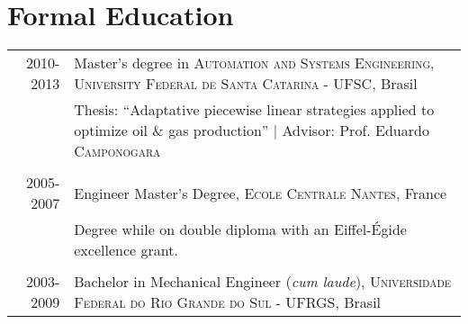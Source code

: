 \documentclass[a4paper,10pt]{article} %
\begin{document}

\section{Formal Education}
\begin{tabular}{rp{11cm}}	
  \textsc{2010-2013} &
  Master's degree in \textsc{Automation and Systems
  Engineering}, \textsc{University Federal de Santa Catarina} - UFSC,
Brasil\\
 & Thesis: ``Adaptative piecewise linear strategies applied to
optimize oil \& gas production'' | \small Advisor: Prof. Eduardo \textsc{Camponogara}\\

&\\


\textsc{2005-2007} &
Engineer Master's Degree, \textsc{Ecole Centrale Nantes}, France\\

& Degree while on double diploma with an Eiffel-Égide excellence grant.\\
&\\


\textsc{2003-2009} &
Bachelor in Mechanical Engineer (\textit{cum laude}),
\textsc{Universidade Federal do Rio Grande do Sul} - UFRGS, Brasil \\
 
\end{tabular}


\end{document}

